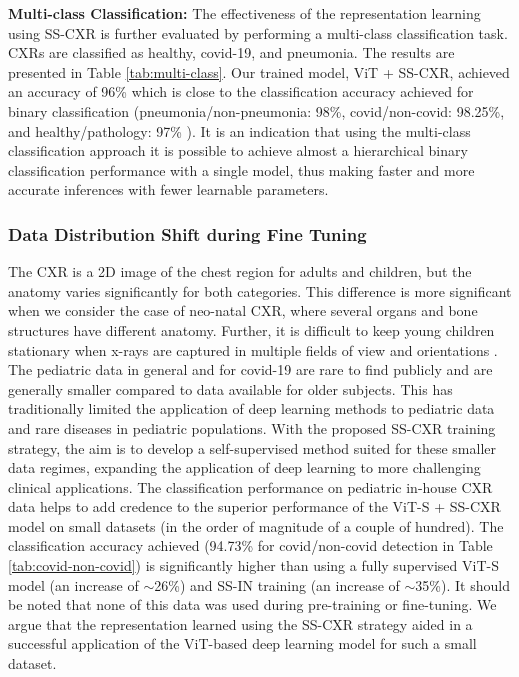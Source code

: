 \documentclass[10pt,journal,compsoc]{IEEEtran}
\begin{document}
\noindent \textbf{Multi-class Classification:}
The effectiveness of the representation learning using SS-CXR is further evaluated by performing a multi-class classification task. CXRs are classified as healthy, covid-19, and pneumonia. The results are presented in Table \ref{tab:multi-class}. Our trained model, ViT + SS-CXR, achieved an accuracy of 96\% which is close to the classification accuracy achieved for binary classification (pneumonia/non-pneumonia: 98\%, covid/non-covid: 98.25\%, and healthy/pathology: 97\% ). It is an indication that using the multi-class classification approach it is possible to achieve almost a hierarchical binary classification performance with a single model, thus making faster and more accurate inferences with fewer learnable parameters.





\subsubsection{Data Distribution Shift during Fine Tuning}\label{finetune_drift}

The CXR is a 2D image of the chest region for adults and children, but the anatomy varies significantly for both categories. This difference is more significant when we consider the case of neo-natal CXR, where several organs and bone structures have different anatomy. Further, it is difficult to keep young children stationary when x-rays are captured in multiple fields of view and orientations \cite{mansoor}. The pediatric data in general and for covid-19 are rare to find publicly and are generally smaller compared to data available for older subjects. This has traditionally limited the application of deep learning methods to pediatric data and rare diseases in pediatric populations. With the proposed SS-CXR training strategy, the aim is to develop a self-supervised method suited for these smaller data regimes, expanding the application of deep learning to more challenging clinical applications. The classification performance on pediatric in-house CXR data helps to add credence to the superior performance of the ViT-S + SS-CXR model on small datasets (in the order of magnitude of a couple of hundred). The  classification accuracy achieved (94.73\% for covid/non-covid detection in Table \ref{tab:covid-non-covid}) is significantly higher than using a fully supervised ViT-S model (an increase of $\sim$26\%) and SS-IN training (an increase of $\sim$35\%). It should be noted that none of this data was used during pre-training or fine-tuning. We argue that the representation learned using the SS-CXR strategy aided in a successful application of the ViT-based deep learning model for such a small dataset. 
\end{document}
